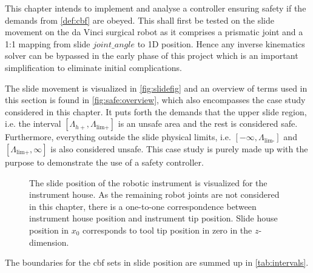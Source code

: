 This chapter intends to implement and analyse a controller ensuring safety if the demands from \autoref{def:cbf} %
are obeyed. This shall first be tested on the slide movement on the da Vinci surgical robot as it comprises a prismatic joint and a 1:1 mapping from slide $joint\_angle$ to 1D position. Hence any inverse kinematics solver can be bypassed in the early phase of this project which is an important simplification to eliminate initial complications.

The slide movement is visualized in \autoref{fig:slidefig} and an overview of terms used in this section is found in \autoref{fig:safe:overview}, which also encompasses  the case study considered in this chapter. It puts forth the demands that the upper slide region, i.e. the interval $[\Lambda_{h+},\Lambda_\text{lim+}]$ is an unsafe area and the rest is considered safe. Furthermore, everything outside the slide physical limits, i.e. $[-\infty,\Lambda_\text{lim-}]$ and $[\Lambda_\text{lim+},\infty]$ is also considered unsafe. This case study is purely made up with the purpose to demonstrate the use of a safety controller.
\begin{figure}[H]
\centering
{}%
%
\caption{The slide position of the robotic instrument is visualized for the instrument house. As the remaining robot joints are not considered in this chapter, there is a one-to-one correspondence between instrument house position and instrument tip position. Slide house position in $x_0$ corresponds to tool tip position in zero in the $z$-dimension.}
\label{fig:slide}
\end{figure}

\vspace{-1mm}
The boundaries for the \gls{cbf} sets in slide position are summed up in \autoref{tab:intervals}.

